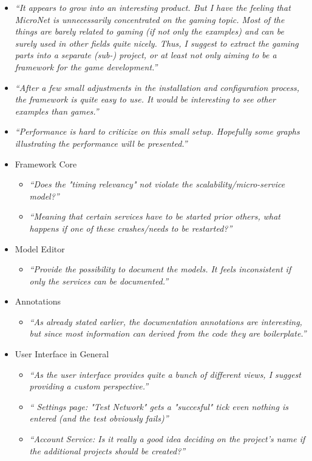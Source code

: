 \begin{itemize}
  \item \textit{``It appears to grow into an interesting product. But I have the
  feeling that MicroNet is unnecessarily concentrated on the gaming topic. Most
  of the things are barely related to gaming (if not only the examples) and can
  be surely used in other fields quite nicely. Thus, I suggest to extract the
  gaming parts into a separate (sub-) project, or at least not only aiming to be
  a framework for the game development.''}
  \item \textit{``After a few small adjustments in the installation and
  configuration process, the framework is quite easy to use. It would be
  interesting to see other examples than games.''}
  \item \textit{``Performance is hard to criticize on this small setup.
  Hopefully some graphs illustrating the performance will be presented.''}
  \item Framework Core
  \begin{itemize}
    \item \textit{``Does the "timing relevancy" not violate the
    scalability/micro-service model?''}
    \item \textit{``Meaning that certain services have to be started prior
    others, what happens if one of these crashes/needs to be restarted?''}
  \end{itemize}
  
  \item Model Editor
  \begin{itemize}
    \item \textit{``Provide the possibility to document the models. It feels
    inconsistent if only the services can be documented.''}
  \end{itemize}
  
  \item Annotations
  \begin{itemize}
    \item \textit{``As already stated earlier, the documentation annotations are
    interesting, but since most information can derived from the code they are boilerplate.''}
  \end{itemize}
  \item User Interface in General
  \begin{itemize}
    \item \textit{``As the user interface provides quite a bunch of different
    views, I suggest providing a custom perspective.''}
    \item \textit{`` Settings page: "Test Network" gets a "succesful" tick even
    nothing is entered (and the test obviously fails)''}
    \item \textit{``Account Service: Is it really a good idea deciding on the
    project's name if the additional projects should be created?''}
  \end{itemize}
  
\end{itemize}




